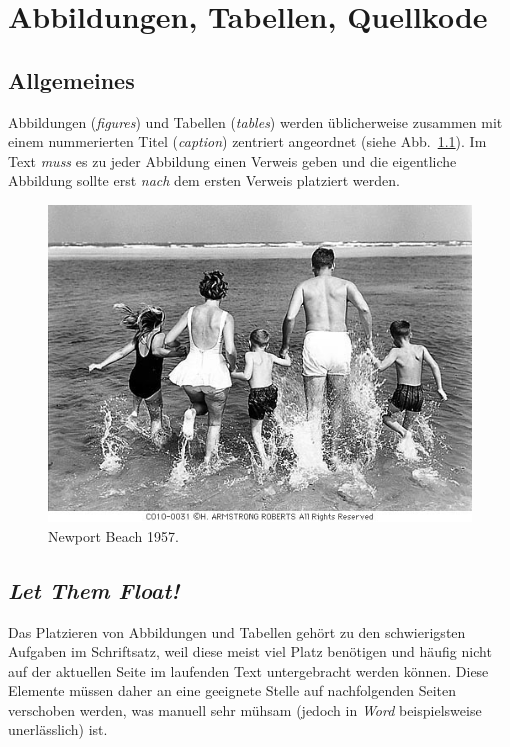 \chapter{Abbildungen, Tabellen, Quellkode}
\label{chap:Abbildungen}

\section{Allgemeines}

Abbildungen (\emph{figures}) und Tabellen (\emph{tables}) werden üblicherweise
zusammen mit einem nummerierten Titel (\emph{caption}) zentriert
angeordnet (siehe Abb.~\ref{fig:urlaub}).
Im Text \emph{muss} es zu jeder Abbildung einen Verweis geben und die eigentliche Abbildung
sollte erst \emph{nach} dem ersten Verweis platziert werden.

\begin{figure}
\centering
\includegraphics[width=.85\textwidth]{CS0031}
\caption{Newport Beach 1957.}
\label{fig:urlaub}
\end{figure}



\section{\emph{Let Them Float!}}

Das Platzieren von Abbildungen und Tabellen gehört zu den
schwierigsten Aufgaben im Schriftsatz, weil diese meist viel Platz
benötigen und häufig nicht auf der aktuellen Seite im laufenden
Text untergebracht werden können. Diese Elemente müssen daher an
eine geeignete Stelle auf nachfolgenden Seiten verschoben werden,
was manuell sehr mühsam (jedoch in \emph{Word} beispielsweise unerlässlich) ist.

